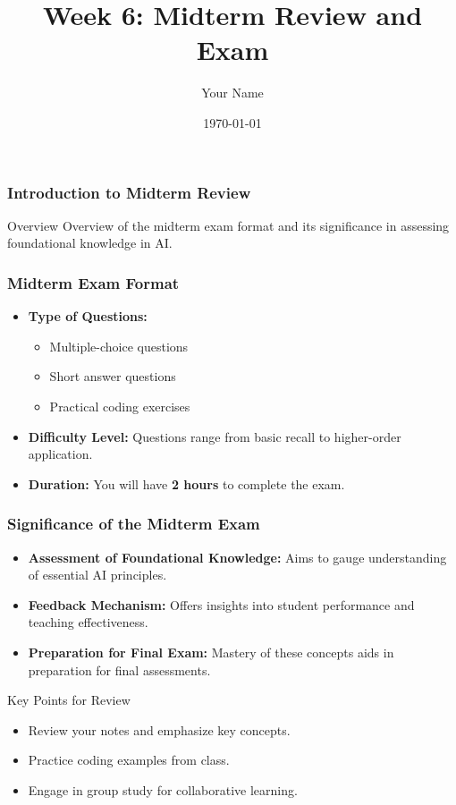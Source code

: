\documentclass{beamer}
\title{Week 6: Midterm Review and Exam}
\author{Your Name}
\institute{Your Institution}
\date{\today}
\begin{document}
\frame{\titlepage}

\begin{frame}[fragile]
    \frametitle{Introduction to Midterm Review}
    \begin{block}{Overview}
        Overview of the midterm exam format and its significance in assessing foundational knowledge in AI.
    \end{block}
\end{frame}

\begin{frame}[fragile]
    \frametitle{Midterm Exam Format}
    \begin{itemize}
        \item \textbf{Type of Questions:}
        \begin{itemize}
            \item Multiple-choice questions
            \item Short answer questions
            \item Practical coding exercises
        \end{itemize}
        \item \textbf{Difficulty Level:} 
        Questions range from basic recall to higher-order application.
        \item \textbf{Duration:} 
        You will have \textbf{2 hours} to complete the exam.
    \end{itemize}
\end{frame}

\begin{frame}[fragile]
    \frametitle{Significance of the Midterm Exam}
    \begin{itemize}
        \item \textbf{Assessment of Foundational Knowledge:} 
        Aims to gauge understanding of essential AI principles.
        \item \textbf{Feedback Mechanism:} 
        Offers insights into student performance and teaching effectiveness.
        \item \textbf{Preparation for Final Exam:} 
        Mastery of these concepts aids in preparation for final assessments.
    \end{itemize}
    \begin{block}{Key Points for Review}
        \begin{itemize}
            \item Review your notes and emphasize key concepts.
            \item Practice coding examples from class.
            \item Engage in group study for collaborative learning.
        \end{itemize}
    \end{block}
\end{frame}
\end{document}
